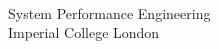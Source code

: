
\begin{titlepage}


	\begin{flushright}
		 \\
		\vspace{4mm}
		\moduletitlefont System Performance Engineering \\
		\vspace{1mm}
		\imperialfont Imperial College London
	\end{flushright}
\end{titlepage}

